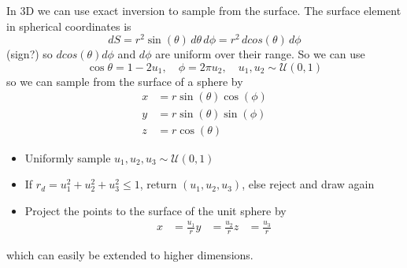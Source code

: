 
In 3D we can use exact inversion to sample from the surface. The surface element in spherical coordinates is
\begin{equation}
    dS = r^2 \sin(\theta) \, d\theta \, d\phi = r^2 \, d cos(\theta) \, d\phi
\end{equation}
(sign?) so $d cos(\theta) d\phi$ and $d \phi$ are uniform over their range. So we can use
\begin{equation}
    \cos \theta = 1 - 2u_1, \quad \phi = 2\pi u_2, \quad u_1, u_2 \sim \mathcal{U}(0,1)
\end{equation}
so we can sample from the surface of a sphere by
\begin{equation}
    \begin{aligned}
        x &= r \sin(\theta) \cos(\phi) \\
        y &= r \sin(\theta) \sin(\phi) \\
        z &= r \cos(\theta)
    \end{aligned}
\end{equation}


\begin{itemize}
    \item Uniformly sample $u_1, u_2, u_3 \sim \mathcal{U}(0,1)$
    \item If $r_d = u_1^2 + u_2^2 + u_3^2 \leq 1$, return $(u_1, u_2, u_3)$, else reject and draw again
    \item Project the points to the surface of the unit sphere by
    \begin{equation}
        \begin{aligned}
            x &= \frac{u_1}{r}
            y &= \frac{u_2}{r}
            z &= \frac{u_3}{r}
        \end{aligned}
    \end{equation}
\end{itemize}
which can easily be extended to higher dimensions.

